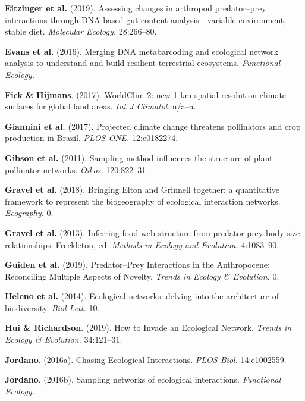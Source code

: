 \leavevmode\hypertarget{ref-EitzAbre19}{}%
\textbf{Eitzinger et al.} (2019). Assessing changes in arthropod
predator--prey interactions through DNA-based gut content
analysis---variable environment, stable diet. \emph{Molecular Ecology.}
28:266--80.

\leavevmode\hypertarget{ref-EvanKits16}{}%
\textbf{Evans et al.} (2016). Merging DNA metabarcoding and ecological
network analysis to understand and build resilient terrestrial
ecosystems. \emph{Functional Ecology.}

\leavevmode\hypertarget{ref-FickHijm17}{}%
\textbf{Fick \& Hijmans}. (2017). WorldClim 2: new 1-km spatial
resolution climate surfaces for global land areas. \emph{Int J
Climatol.}:n/a--a.

\leavevmode\hypertarget{ref-GianCost17}{}%
\textbf{Giannini et al.} (2017). Projected climate change threatens
pollinators and crop production in Brazil. \emph{PLOS ONE.} 12:e0182274.

\leavevmode\hypertarget{ref-GibsKnot11}{}%
\textbf{Gibson et al.} (2011). Sampling method influences the structure
of plant--pollinator networks. \emph{Oikos.} 120:822--31.

\leavevmode\hypertarget{ref-GravBais18}{}%
\textbf{Gravel et al.} (2018). Bringing Elton and Grinnell together: a
quantitative framework to represent the biogeography of ecological
interaction networks. \emph{Ecography.} 0.

\leavevmode\hypertarget{ref-GravPois13}{}%
\textbf{Gravel et al.} (2013). Inferring food web structure from
predator-prey body size relationships. Freckleton, ed. \emph{Methods in
Ecology and Evolution.} 4:1083--90.

\leavevmode\hypertarget{ref-GuidBart19}{}%
\textbf{Guiden et al.} (2019). Predator--Prey Interactions in the
Anthropocene: Reconciling Multiple Aspects of Novelty. \emph{Trends in
Ecology \& Evolution.} 0.

\leavevmode\hypertarget{ref-HeleGarc14}{}%
\textbf{Heleno et al.} (2014). Ecological networks: delving into the
architecture of biodiversity. \emph{Biol Lett.} 10.

\leavevmode\hypertarget{ref-HuiRich19}{}%
\textbf{Hui \& Richardson}. (2019). How to Invade an Ecological Network.
\emph{Trends in Ecology \& Evolution.} 34:121--31.

\leavevmode\hypertarget{ref-Jord16}{}%
\textbf{Jordano}. (2016a). Chasing Ecological Interactions. \emph{PLOS
Biol.} 14:e1002559.

\leavevmode\hypertarget{ref-Jord16a}{}%
\textbf{Jordano}. (2016b). Sampling networks of ecological interactions.
\emph{Functional Ecology.}

